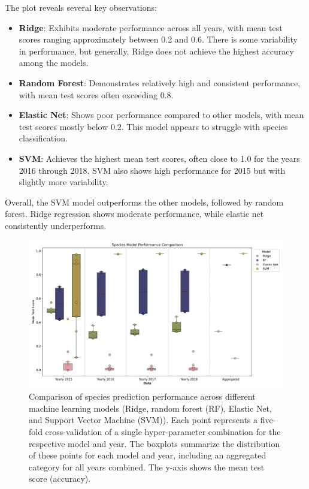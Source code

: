 \documentclass[english,11pt,a4paper,titlepage]{article}
\begin{document}
The plot reveals several key observations:
\begin{itemize}
	\item \textbf{Ridge}: Exhibits moderate performance across all years, with mean test scores ranging approximately between 0.2 and 0.6. There is some variability in performance, but generally, Ridge  does not achieve the highest accuracy among the models.
	\item \textbf{Random Forest}: Demonstrates relatively high and consistent performance, with mean test scores often exceeding 0.8.
	\item \textbf{Elastic Net}: Shows poor performance compared to other models, with mean test scores mostly below 0.2. This model appears to struggle with species classification.
	\item \textbf{SVM}: Achieves the highest mean test scores, often close to 1.0 for the years 2016 through 2018. SVM also shows high performance for 2015 but with slightly more variability.
\end{itemize}

Overall, the SVM model outperforms the other models, followed by random forest. Ridge regression shows moderate performance, while elastic net consistently underperforms.

\begin{figure}[h]
	\includegraphics[width=0.9\linewidth]{img/model_comparison.png}
	\caption{Comparison of species prediction performance across different machine learning models (Ridge, random forest (RF), Elastic Net, and Support Vector Machine (SVM)). Each point represents a five-fold cross-validation of a single hyper-parameter combination for the respective model and year. The boxplots summarize the distribution of these points for each model and year, including an aggregated category for all years combined. The y-axis shows the mean test score (accuracy).}
	\label{fig:model_comparison_species}
\end{figure}
\end{document}
